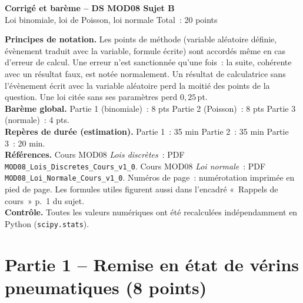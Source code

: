 \documentclass[a4paper,11pt]{article}
\newcommand{\LD}{Cours MOD08 \textit{Lois discrètes}}
\newcommand{\LN}{Cours MOD08 \textit{Loi normale}}
\begin{document}
\begin{tcolorbox}[colback=uimmred, colframe=uimmred, sharp corners, boxrule=0pt,
  left=14pt, right=14pt, top=10pt, bottom=10pt]
{\color{white}\LARGE\bfseries Corrigé et barème -- DS MOD08 \hfill Sujet B}\\[4pt]
{\color{white}\large Loi binomiale, loi de Poisson, loi normale \hfill Total~: 20 points}
\end{tcolorbox}

\begin{tcolorbox}[colback=uimmlightgray, colframe=uimmgray, boxrule=0.8pt, arc=3pt]
\small\textbf{Principes de notation.} Les points de méthode (variable aléatoire définie, évènement traduit avec la variable, formule écrite) sont accordés même en cas d'erreur de calcul. Une erreur n'est sanctionnée qu'une fois~: la suite, cohérente avec un résultat faux, est notée normalement. Un résultat de calculatrice sans l'évènement écrit avec la variable aléatoire perd la moitié des points de la question. Une loi citée sans ses paramètres perd $0{,}25$\,pt.\\[3pt]
\textbf{Barème global.} Partie 1 (binomiale)~: 8 pts \quad Partie 2 (Poisson)~: 8 pts \quad Partie 3 (normale)~: 4 pts.\\[3pt]
\textbf{Repères de durée (estimation).} Partie 1~: 35 min \quad Partie 2~: 35 min \quad Partie 3~: 20 min.\\[3pt]
\textbf{Références.} \LD{}~: PDF \texttt{MOD08\_Lois\_Discretes\_Cours\_v1\_0}. \LN{}~: PDF \texttt{MOD08\_Loi\_Normale\_Cours\_v1\_0}. Numéros de page~: numérotation imprimée en pied de page. Les formules utiles figurent aussi dans l'encadré «~Rappels de cours~» p.~1 du sujet.\\[3pt]
\textbf{Contrôle.} Toutes les valeurs numériques ont été recalculées indépendamment en Python (\texttt{scipy.stats}).
\end{tcolorbox}

\needspace{9cm}
\section{Partie 1 -- Remise en état de vérins pneumatiques (8 points)}
\end{document}
